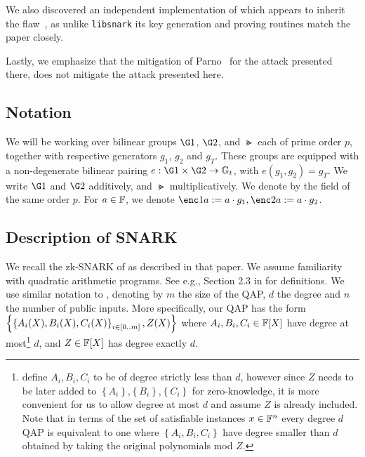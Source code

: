 \documentclass[11pt]{article}
\numberwithin{figure}{section} %
\newcommand{\set}[1]{\ensuremath{\left\{#1\right\}}\xspace}
\begin{document}
We also discovered an independent implementation of \cite{BCTV} which appears to inherit the flaw~\cite{snarkjs}, as unlike \texttt{libsnark} its key generation and proving routines match the paper closely.

Lastly, we emphasize that the mitigation of Parno~\cite{Parno15} for the attack presented there, does not mitigate the attack presented here.

\subsection{Notation}
We will be working over bilinear groups $\G1$, $\G2$, and $\Gt$ each of prime order $p$, together with respective generators $g_1$, $g_2$ and $g_T$.
These groups are equipped with a non-degenerate bilinear pairing $e:\G1 \times \G2 \to \Gt$, with $e(g_1, g_2) = g_T$.
We write $\G1$ and $\G2$ additively, and $\Gt$ multiplicatively.
We denote by \F the field of the same order $p$.
For $a \in \mathbb F$, we denote $\enc1{a}\defeq a\cdot g_1, \enc2{a}\defeq a\cdot g_2$.

\subsection{Description of \cite{BCTV} SNARK}\label{subsec:bctv}

We recall the zk-SNARK of \cite{BCTV} as described in that paper.
We assume familiarity with quadratic arithmetic programs.
See e.g., Section 2.3 in \cite{groth16} for definitions.
We use similar notation to \cite{BCTV}, denoting by $m$ the size of the QAP, $d$ the degree and $n$ the number of public inputs.
More specifically, our QAP has the form \set{\sett{A_i(X),B_i(X),C_i(X)}{i\in [0..m]}, Z(X)}
where $A_i,B_i,C_i\in \mathbb F[X]$ have degree at most\footnote{\cite{BCTV} define $A_i,B_i,C_i$ to be of degree strictly less than $d$, however since $Z$ needs to be later added to \set{A_i},\set{B_i},\set{C_i} for zero-knowledge, it is more convenient for us to allow degree at most $d$ and assume $Z$ is already included. Note that in terms of the set of satisfiable instances $x\in \mathbb F^n$ every degree $d$ QAP is equivalent to one where \set{A_i,B_i,C_i} have degree smaller than $d$ obtained by taking the original polynomials mod $Z$.} $d$, and $Z\in \mathbb F[X]$ has degree exactly $d$.
\end{document}
